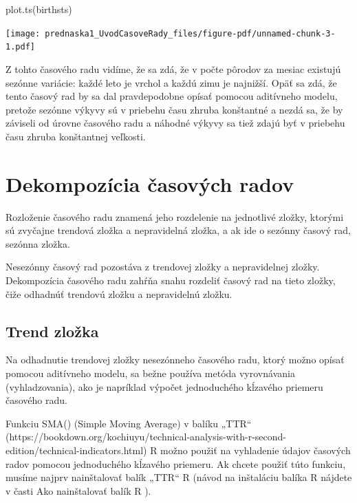 \documentclass[
  letterpaper,
  DIV=11,
  numbers=noendperiod]{scrreprt}
\newenvironment{Shaded}{\begin{snugshade}}{\end{snugshade}}
\newcommand{\FunctionTok}[1]{\textcolor[rgb]{0.28,0.35,0.67}{#1}}
\newcommand{\NormalTok}[1]{\textcolor[rgb]{0.00,0.23,0.31}{#1}}
\begin{document}
\begin{Shaded}
\begin{Highlighting}[]
\FunctionTok{plot.ts}\NormalTok{(birthsts)}
\end{Highlighting}
\end{Shaded}

\texttt{[image: prednaska1\_UvodCasoveRady\_files/figure-pdf/unnamed-chunk-3-1.pdf]}

Z tohto časového radu vidíme, že sa zdá, že v počte pôrodov za mesiac
existujú sezónne variácie: každé leto je vrchol a každú zimu je
najnižší. Opäť sa zdá, že tento časový rad by sa dal pravdepodobne
opísať pomocou aditívneho modelu, pretože sezónne výkyvy sú v priebehu
času zhruba konštantné a nezdá sa, že by záviseli od úrovne časového
radu a náhodné výkyvy sa tiež zdajú byť v priebehu času zhruba
konštantnej veľkosti.

\section{Dekompozícia časových
radov}\label{dekompozuxedcia-ux10dasovuxfdch-radov}

Rozloženie časového radu znamená jeho rozdelenie na jednotlivé zložky,
ktorými sú zvyčajne trendová zložka a nepravidelná zložka, a ak ide o
sezónny časový rad, sezónna zložka.

Nesezónny časový rad pozostáva z trendovej zložky a nepravidelnej
zložky. Dekompozícia časového radu zahŕňa snahu rozdeliť časový rad na
tieto zložky, čiže odhadnúť trendovú zložku a nepravidelnú zložku.

\subsection{Trend zložka}\label{trend-zloux17eka}

Na odhadnutie trendovej zložky nesezónneho časového radu, ktorý možno
opísať pomocou aditívneho modelu, sa bežne používa metóda vyrovnávania
(vyhladzovania), ako je napríklad výpočet jednoduchého kĺzavého priemeru
časového radu.

Funkciu SMA() (Simple Moving Average) v balíku „TTR``
(https://bookdown.org/kochiuyu/technical-analysis-with-r-second-edition/technical-indicators.html)
R možno použiť na vyhladenie údajov časových radov pomocou jednoduchého
kĺzavého priemeru. Ak chcete použiť túto funkciu, musíme najprv
nainštalovať balík „TTR`` R (návod na inštaláciu balíka R nájdete v
časti Ako nainštalovať balík R ).
\end{document}

